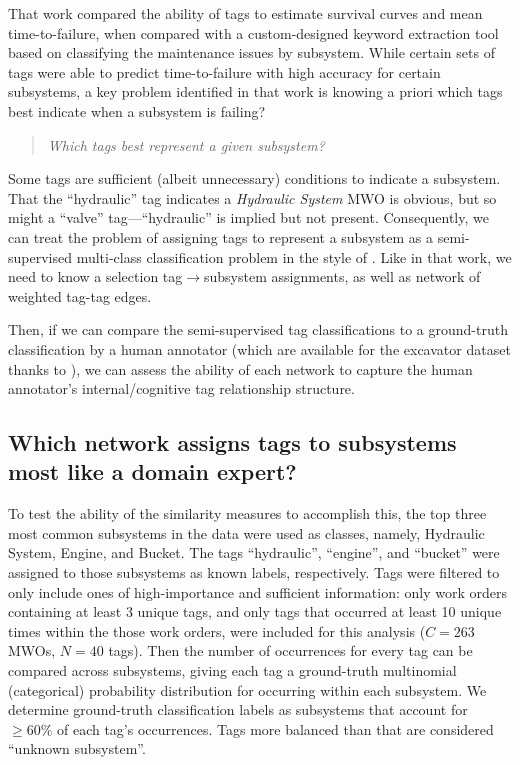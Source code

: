 \documentclass[%
	12pt,
		oneside,
		letterpaper
]{book}
\begin{document}
That work compared the ability of tags to estimate survival curves and mean time-to-failure, when compared with a custom-designed keyword extraction tool based on classifying the maintenance issues by subsystem.
While certain sets of tags were able to predict time-to-failure with high accuracy for certain subsystems, a key problem identified in that work is knowing a priori which tags best indicate when a subsystem is failing?

\begin{quote}
\emph{Which tags best represent a given subsystem?}
\end{quote}

Some tags are sufficient (albeit unnecessary) conditions to indicate a subsystem.
That the ``hydraulic'' tag indicates a \emph{Hydraulic System} MWO is obvious, but so might a ``valve'' tag---``hydraulic'' is implied but not present.
Consequently, we can treat the problem of assigning tags to represent a subsystem as a semi-supervised multi-class classification problem in the style of \textcite{Semisupervisedlearning_Avrachenkov2017}.
Like in that work, we need to know a selection tag\(\rightarrow\)subsystem assignments, as well as network of weighted tag-tag edges.

Then, if we can compare the semi-supervised tag classifications to a ground-truth classification by a human annotator (which are available for the excavator dataset thanks to \textcite{sharedreliabilitydatabase_Ho2015}), we can assess the ability of each network to capture the human annotator's internal/cognitive tag relationship structure.

\subsection{Which network assigns tags to subsystems most like a domain expert?}\label{which-network-assigns-tags-to-subsystems-most-like-a-domain-expert}

To test the ability of the similarity measures to accomplish this, the top three most common subsystems in the data were used as classes, namely, Hydraulic System, Engine, and Bucket.
The tags ``hydraulic'', ``engine'', and ``bucket'' were assigned to those subsystems as known labels, respectively.
Tags were filtered to only include ones of high-importance and sufficient information: only work orders containing at least 3 unique tags, and only tags that occurred at least 10 unique times within the those work orders, were included for this analysis (\(C=263\) MWOs, \(N=40\) tags).
Then the number of occurrences for every tag can be compared across subsystems, giving each tag a ground-truth multinomial (categorical) probability distribution for occurring within each subsystem.
We determine ground-truth classification labels as subsystems that account for \(\geq60\%\) of each tag's occurrences.
Tags more balanced than that are considered ``unknown subsystem''.
\end{document}
